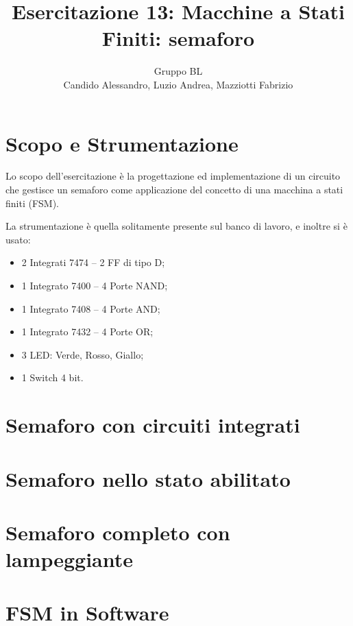 \documentclass[a4paper,10pt]{article}
\title{Esercitazione 13: Macchine a Stati Finiti: semaforo}
\author{Gruppo BL \\ Candido Alessandro, Luzio Andrea, Mazziotti Fabrizio}
\begin{document}
\maketitle

\section{Scopo e Strumentazione}
Lo scopo dell'esercitazione è la progettazione ed implementazione di un circuito che gestisce un semaforo come applicazione del concetto di una macchina a stati finiti (FSM).
\newline

\noindent La strumentazione è quella solitamente presente sul banco di lavoro, e inoltre si è usato:
\begin{itemize}
	\item 2 Integrati 7474 – 2 FF di tipo D;
	\item 1 Integrato 7400 – 4 Porte NAND;
	\item 1 Integrato 7408 – 4 Porte AND;
	\item 1 Integrato 7432 – 4 Porte OR;
	\item 3 LED: Verde, Rosso, Giallo;
	\item 1 Switch 4 bit.
\end{itemize}

\section{Semaforo con circuiti integrati}

\section{Semaforo nello stato abilitato}

\section{Semaforo completo con lampeggiante}

\section{FSM in Software}
\end{document}
